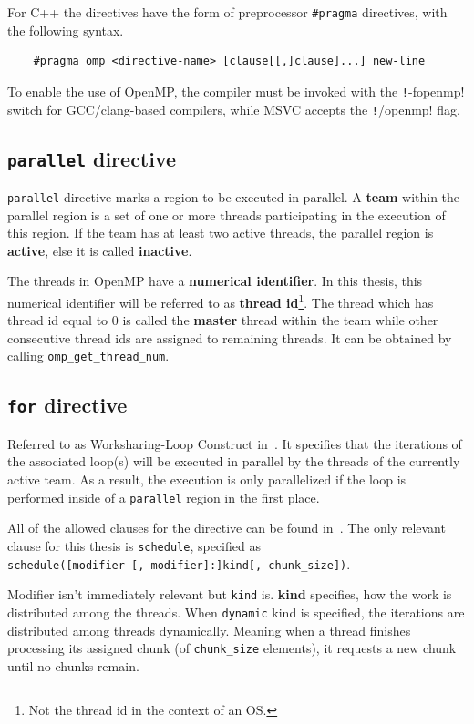 \documentclass[thesis=M,english]{FITthesis}[2019/12/23]
\newcommand{\csre}[1]{\texttt!#1!}
\begin{document}
For C++ the directives have the form of preprocessor \texttt{\#pragma} directives, with the following
syntax.
\begin{verbatim}
    #pragma omp <directive-name> [clause[[,]clause]...] new-line
\end{verbatim}

To enable the use of OpenMP, the compiler must be invoked with the \csre{-fopenmp}
switch for GCC/clang-based compilers, while MSVC accepts the \csre{/openmp} flag.

\subsection{\texttt{parallel} directive}

\texttt{parallel} directive marks a region to be executed in parallel. A \textbf{team} within the parallel
region is a set of one or more threads participating in the execution of this region. If the team has at
least two active threads, the parallel region is \textbf{active}, else it is called \textbf{inactive}.

The threads in OpenMP have a \textbf{numerical identifier}. In this thesis, this numerical identifier will be
referred to as \textbf{thread id}\footnote{Not the thread id in the context of an OS.}.
The thread which has thread id equal to 0 is called the \textbf{master}
thread within the team while other consecutive thread ids are assigned to remaining threads.
It can be obtained by calling \texttt{omp_get_thread_num}.

\subsection{\texttt{for} directive}

Referred to as Worksharing-Loop Construct in~\cite{openmp18}. It specifies that the iterations
of the associated loop(s) will be executed in parallel by the threads of the currently active
team. As a result, the execution is only parallelized if the loop is performed inside of a
\texttt{parallel} region in the first place.

All of the allowed clauses for the directive can be found in~\cite{openmp18}. The only relevant clause
for this thesis is \texttt{schedule}, specified as \\
\texttt{schedule([modifier [, modifier]:]kind[, chunk\_size])}.

Modifier isn't immediately relevant
but \texttt{kind} is. \textbf{kind} specifies, how the work is distributed among the threads.
When \texttt{dynamic} kind is specified, the iterations are distributed among threads dynamically.
Meaning when a thread finishes processing its assigned chunk (of \texttt{chunk\_size} elements),
it requests a new chunk until no chunks remain.
\end{document}
